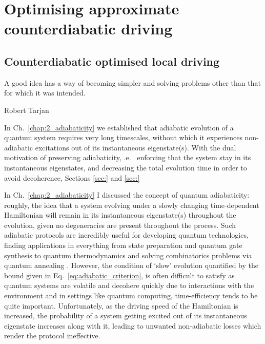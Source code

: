 \part{Optimising approximate counterdiabatic driving}

\chapter{Counterdiabatic optimised local driving}\label{chap:4_COLD}

\epigraph{A good idea has a way of becoming simpler and solving problems other than that for which it was intended.}{Robert Tarjan}

In Ch.~\ref{chap:2_adiabaticity} we established that adiabatic evolution of a quantum system requires very long timescales, without which it experiences non-adiabatic excitations out of its instantaneous eigenstate(s). With the dual motivation of preserving adiabaticity, \@i.e.~ enforcing that the system stay in its instantaneous eigenstates, and decreasing the total evolution time in order to avoid decoherence, Sections \ref{sec:} and \ref{sec:}

\iffalse
In Ch.~\ref{chap:2_adiabaticity} I discussed the concept of quantum adiabaticity: roughly, the idea that a system evolving under a slowly changing time-dependent Hamiltonian will remain in its instantaneous eigenstate(s) throughout the evolution, given no degeneracies are present throughout the process. Such adiabatic protocols are incredibly useful for developing quantum technologies, finding applications in everything from state preparation \cite{dimitrova_many-body_2023} and quantum gate synthesis \cite{pelegri_high-fidelity_2022} to quantum thermodynamics\cite{campo_more_2014} and solving combinatorics problems via quantum annealing \cite{ebadi_quantum_2022}. However, the condition of `slow' evolution quantified by the bound given in Eq.~\eqref{eq:adiabatic_criterion}, is often difficult to satisfy as quantum systems are volatile and decohere quickly due to interactions with the environment and in settings like quantum computing, time-efficiency tends to be quite important. Unfortunately, as the driving speed of the Hamiltonian is increased, the probability of a system getting excited out of its instantaneous eigenstate increases along with it, leading to unwanted non-adiabatic losses which render the protocol ineffective. 


